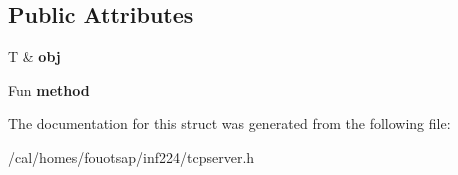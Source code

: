 \subsection*{Public Attributes}
\begin{DoxyCompactItemize}
\item 
\hypertarget{structcppu_1_1_t_c_p_server_1_1_callback_method_ae480535d346efc119fb5c43880f349c8}{T \& {\bfseries obj}}\label{structcppu_1_1_t_c_p_server_1_1_callback_method_ae480535d346efc119fb5c43880f349c8}

\item 
\hypertarget{structcppu_1_1_t_c_p_server_1_1_callback_method_aab858a039ddee71fb65a0e35c173f067}{Fun {\bfseries method}}\label{structcppu_1_1_t_c_p_server_1_1_callback_method_aab858a039ddee71fb65a0e35c173f067}

\end{DoxyCompactItemize}


The documentation for this struct was generated from the following file\+:\begin{DoxyCompactItemize}
\item 
/cal/homes/fouotsap/inf224/tcpserver.\+h\end{DoxyCompactItemize}
